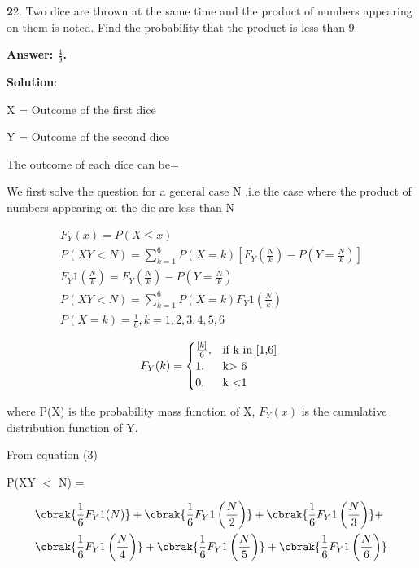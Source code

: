 \documentclass[journal,12pt]{IEEEtran}
\begin{document}
%

\textbf22. Two dice are thrown at the same time and the product of numbers appearing on them is noted. Find the probability that the product is less than 9.

\textbf{Answer: $\frac{4}{9}$.}

\textbf{Solution}:

X = Outcome of the first dice

Y = Outcome of the second dice

\noindent The outcome of each dice can be= 

\noindent We first solve the question for a general case N ,i.e the case where the product of numbers appearing on the die are less than N

\begin{align}
 F_Y(x)= P(X\leqslant x)\\
 P(XY<N) = \sum_{k=1}^{6} P(X=k) [F_Y( \frac{N}{k} )-P(Y=\frac{N}{k})]\\
 F_Y1(\frac{N}{k}) = F_Y(\frac{N}{k})-P(Y=\frac{N}{k})\\
 P(XY<N) = \sum_{k=1}^{6} P(X=k) F_Y1(\frac{N}{k})\\
 P(X=k) = \frac{1}{6} , k = 1, 2, 3, 4, 5, 6
 \end{align}
 
\begin{align}
 F_Y(k)=
 \begin{cases}
 \frac{[k]}{6},&\text{if k in [1,6] }\\
  1, & \text{k$ >$ 6}\\
  0, & \text{k $<$1}\\
 \end{cases}
 \end{align}
 
where P(X) is the probability mass function of X, $F_Y(x)$
is the cumulative distribution function of Y.

\noindent From equation (3)

\noindent P(XY $<$ N) = 

\noindent
\noindent
\[
\begin{aligned}
&\cbrak{\frac{1}{6} F_Y1(N)} + \cbrak{\frac{1}{6} F_Y1\left(\frac{N}{2}\right)} + \cbrak{\frac{1}{6} F_Y1\left(\frac{N}{3}\right)} + \\
&\cbrak{\frac{1}{6} F_Y1\left(\frac{N}{4}\right)} + \cbrak{\frac{1}{6} F_Y1\left(\frac{N}{5}\right)} + \cbrak{\frac{1}{6} F_Y1\left(\frac{N}{6}\right)}
\end{aligned}
\]
\end{document}
